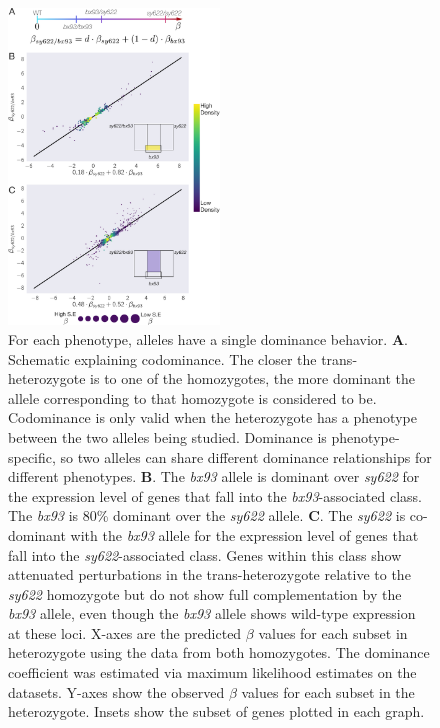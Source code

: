 \documentclass[10pt, onecolumn]{article}
\begin{document}
\begin{figure}
  \centering{}
  \includegraphics[width=0.5\textwidth]{../figs/dominance_classes.pdf}
  \caption{
    For each phenotype, alleles have a single dominance behavior.
    \textbf{A}. Schematic explaining codominance. The closer the
    trans-heterozygote is to one of the homozygotes, the more dominant the allele
    corresponding to that homozygote is considered to be. Codominance is only
    valid when the heterozygote has a phenotype between the two alleles being
    studied. Dominance is phenotype-specific, so two alleles can share different
    dominance relationships for different phenotypes.
    \textbf{B}. The \emph{bx93} allele is dominant over \emph{sy622} for the
    expression level of genes that fall into the \emph{bx93}-associated class.
    The \emph{bx93} is 80\% dominant over the \emph{sy622} allele.
    \textbf{C}. The \emph{sy622} is co-dominant with the \emph{bx93} allele for
    the expression level of genes that fall into the \emph{sy622}-associated
    class. Genes within this class show attenuated perturbations in the
    trans-heterozygote relative to the \emph{sy622} homozygote but do not show
    full complementation by the \emph{bx93} allele, even though the \emph{bx93}
    allele shows wild-type expression at these loci. X-axes are the predicted
    $\beta$ values for each subset in heterozygote using the data from both
    homozygotes. The dominance coefficient was estimated via maximum likelihood
    estimates on the datasets. Y-axes show the observed $\beta$ values for each
    subset in the heterozygote. Insets show the subset of genes plotted in each
    graph.
    }
\label{fig:transhet}
\end{figure}
\end{document}
